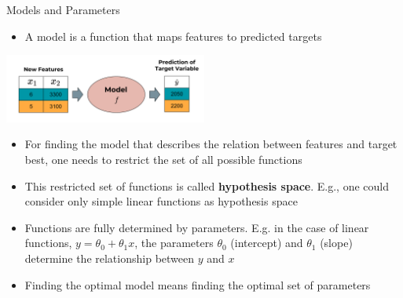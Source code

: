 \documentclass[11pt,compress,t,notes=noshow, xcolor=table]{beamer}
\begin{document}
\begin{vbframe}{Models and Parameters}
\small 
\begin{itemize}
    \item A model is a function that maps features to predicted targets
\end{itemize}

\begin{center}
  \includegraphics[width = 0.5\textwidth]{figure_man/the_model_web.png} 
\end{center}

\small
\begin{itemize}
\item  For finding the model that describes the relation between features and target best, one needs to restrict the set of all possible functions
\item This restricted set of functions is called \textbf{hypothesis space}. E.g., one could consider only simple linear functions as hypothesis space
\item Functions are fully determined by parameters. E.g. in the case of linear functions, $y = \theta_0 + \theta_1 x $, the parameters $\theta_0$ (intercept) and $\theta_1$ (slope) determine the relationship between $y$ and $x$
\item Finding the optimal model means finding the optimal set of parameters
\end{itemize}

\end{vbframe}
\end{document}
